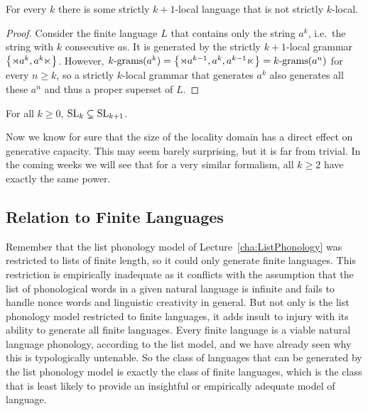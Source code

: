 \begin{lemma}
    For every $k$ there is some strictly $k+1$-local language that is not strictly $k$-local.
    \label{lem:SLMath_SL-HierarchyProper}
\end{lemma}
%
\begin{proof}
    Consider the finite language $L$ that contains only the string $a^k$, i.e.\ the string with $k$ consecutive $a$s.
    It is generated by the strictly $k+1$-local grammar $\setof{\LeftEdge a^k, a^k \RightEdge}$.
    However, $\Bigrams[k](a^k) = \setof{\LeftEdge a^{k-1}, a^k, a^{k-1} \RightEdge} = \Bigrams[k](a^n)$ for every $n \geq k$, so a strictly $k$-local grammar that generates $a^k$ also generates all these $a^n$ and thus a proper superset of $L$.
\end{proof}
%
\begin{theorem}
    For all $k \geq 0$, $\SL_k \subsetneq \SL_{k+1}$.    
\end{theorem}

Now we know for sure that the size of the locality domain has a direct effect on generative capacity.
This may seem barely surprising, but it is far from trivial.
In the coming weeks we will see that for a very similar formalism, all $k \geq 2$ have exactly the same power.


\subsection{Relation to Finite Languages}

Remember that the list phonology model of Lecture~\ref{cha:ListPhonology} was restricted to lists of finite length, so it could only generate finite languages.
This restriction is empirically inadequate as it conflicts with the assumption that the list of phonological words in a given natural language is infinite and fails to handle nonce words and linguistic creativity in general.
But not only is the list phonology model restricted to finite languages, it adds insult to injury with its ability to generate all finite languages.
Every finite language is a viable natural language phonology, according to the list model, and we have already seen why this is typologically untenable.
So the class of languages that can be generated by the list phonology model is exactly the class of finite languages, which is the class that is least likely to provide an insightful or empirically adequate model of language.


